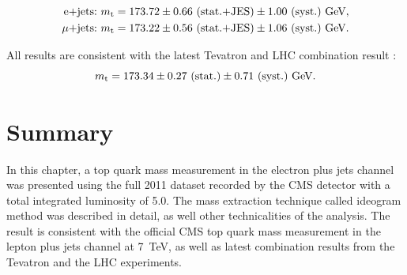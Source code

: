 \begin{equation}
\begin{split}
	\textrm{e+jets:}~m_\mathrm{t} = 173.72 \pm 0.66~\textrm{(stat.+JES)} \pm 1.00~\textrm{(syst.)}~\textrm{GeV},\\
	\mu\textrm{+jets:}~m_\mathrm{t} = 173.22 \pm 0.56~\textrm{(stat.+JES)} \pm 1.06~\textrm{(syst.)}~\textrm{GeV}.\\
	\label{final_result_official_emujets}
\end{split}
\end{equation}

All results are consistent with the latest Tevatron and LHC combination result \autocite{world_top_mass_combination}:
\begin{equation*}
m_\mathrm{t} = 173.34 \pm 0.27~\textrm{(stat.)} \pm 0.71~\textrm{(syst.)}~\textrm{GeV}.
\end{equation*}


\section{Summary}
\label{s_top_mass:summary}

In this chapter, a top quark mass measurement in the electron plus jets channel was presented using the full 2011
dataset recorded by the CMS detector with a total integrated luminosity of \SI{5.0}{\fbinv}. The mass extraction
technique called ideogram method was described in detail, as well other technicalities of the analysis. The result is
consistent with the official CMS top quark mass measurement in the lepton plus jets channel at \SI{7}{\TeV}, as well as
latest combination results from the Tevatron and the LHC experiments.





